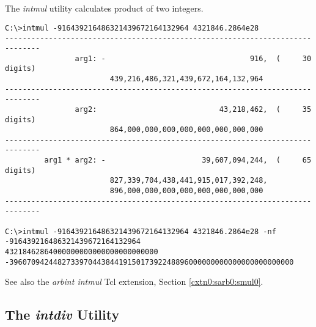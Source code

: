 \begin{dosutilcommandsynopsis}
\end{dosutilcommandsynopsis}

\begin{dosutilcommanddescription}
The \emph{intmul} utility calculates product of two 
integers.
\end{dosutilcommanddescription}


\begin{dosutilcommandsampleinvocations}
\begin{scriptsize}
\begin{verbatim}
C:\>intmul -916439216486321439672164132964 4321846.2864e28
------------------------------------------------------------------------------
                arg1: -                                 916,  (     30 digits)
                        439,216,486,321,439,672,164,132,964
------------------------------------------------------------------------------
                arg2:                            43,218,462,  (     35 digits)
                        864,000,000,000,000,000,000,000,000
------------------------------------------------------------------------------
         arg1 * arg2: -                      39,607,094,244,  (     65 digits)
                        827,339,704,438,441,915,017,392,248,
                        896,000,000,000,000,000,000,000,000
------------------------------------------------------------------------------

C:\>intmul -916439216486321439672164132964 4321846.2864e28 -nf
-916439216486321439672164132964
43218462864000000000000000000000000
-39607094244827339704438441915017392248896000000000000000000000000
\end{verbatim}
\end{scriptsize}
\end{dosutilcommandsampleinvocations}

\begin{dosutilcommandseealso}
See also the \emph{arbint intmul} Tcl extension, 
Section \cxtnzeroxrefhyphen{}\ref{cxtn0:sarb0:smul0}.
\end{dosutilcommandseealso}

\subsection{The \emph{intdiv} Utility}
\label{cdcm0:sali0:sdiv0}


